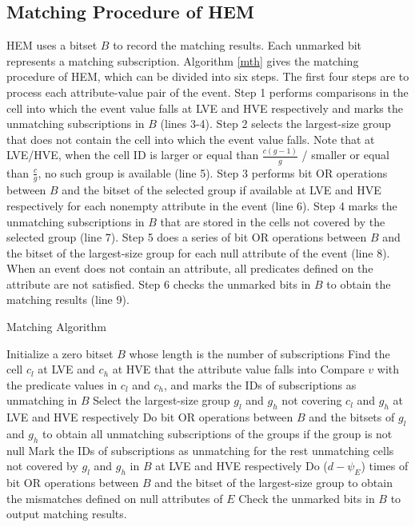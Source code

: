 \documentclass[runningheads]{llncs}
\begin{document}
\subsection{Matching Procedure of HEM}
\label{ba}
HEM uses a bitset $B$ to record the matching results. Each unmarked bit represents a matching subscription.
Algorithm \ref{mth} gives the matching procedure of HEM, which can be divided into six steps. The first four steps are to process each attribute-value pair of the event. 
Step 1 performs comparisons in the cell into which the event value falls at LVE and HVE respectively and marks the unmatching subscriptions in $B$ (lines 3-4).
Step 2 selects the largest-size group that does not contain the cell into which the event value falls. Note that at LVE/HVE, when the cell ID is larger or equal than $\frac{c(g-1)}{g}$ / smaller or equal than $\frac{c}{g}$, no such group is available (line 5). 
Step 3 performs bit OR operations between $B$ and the bitset of the selected group if available at LVE and HVE respectively for each nonempty attribute in the event (line 6). 
Step 4 marks the unmatching subscriptions in $B$ that are stored in the cells not covered by the selected group (line 7). 
Step 5 does a series of bit OR operations between $B$ and the bitset of the largest-size group for each null attribute of the event (line 8). When an event does not contain an attribute, all predicates defined on the attribute are not satisfied.
Step 6 checks the unmarked bits in $B$ to obtain the matching results (line 9). 
% 
\begin{algorithm}[tbp]
  \caption{Matching Algorithm} 
  \label{mth}
    Initialize a zero bitset $B$ whose length is the number of subscriptions\;
    { 
        Find the cell $c_l$ at LVE and $c_h$ at HVE that the attribute value falls into\; 
        Compare $v$ with the predicate values in $c_l$ and $c_h$, and marks the IDs of subscriptions as unmatching in $B$\;
        Select the largest-size group $g_l$ and $g_h$ not covering $c_l$ and $g_h$ at LVE and HVE respectively\;
        Do bit OR operations between $B$ and the bitsets of $g_l$ and $g_h$ to obtain all unmatching subscriptions of the groups if the group is not null\;
        Mark the IDs of subscriptions as unmatching for the rest unmatching cells not covered by $g_l$ and $g_h$ in $B$ at LVE and HVE respectively\;
    }
    Do ($d-\psi_E$) times of bit OR operations between $B$ and the bitset of the largest-size group to obtain the mismatches defined on null attributes of $E$\;
    Check the unmarked bits in $B$ to output matching results.
\end{algorithm}
\end{document}
